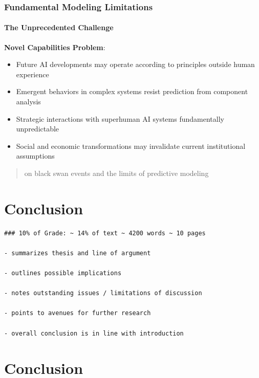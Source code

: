 \documentclass[
  11pt,
  letterpaper,
]{book}
\providecommand{\tightlist}{%
  \setlength{\itemsep}{0pt}\setlength{\parskip}{0pt}}
\begin{document}
\subsection{Fundamental Modeling
Limitations}\label{sec-fundamental-limitations}

\subsubsection{The Unprecedented
Challenge}\label{sec-unprecedented-challenge}

\textbf{Novel Capabilities Problem}:

\begin{itemize}
\tightlist
\item
  Future AI developments may operate according to principles outside
  human experience
\item
  Emergent behaviors in complex systems resist prediction from component
  analysis
\item
  Strategic interactions with superhuman AI systems fundamentally
  unpredictable
\item
  Social and economic transformations may invalidate current
  institutional assumptions
\end{itemize}

\begin{quote}
\textcite{taleb2007} on black swan events and the limits of predictive
modeling
\end{quote}


\chapter{Conclusion}\label{conclusion}

\begin{verbatim}
### 10% of Grade: ~ 14% of text ~ 4200 words ~ 10 pages

- summarizes thesis and line of argument

- outlines possible implications

- notes outstanding issues / limitations of discussion

- points to avenues for further research

- overall conclusion is in line with introduction
\end{verbatim}


\chapter{Conclusion}\label{sec-conclusion}
\end{document}
